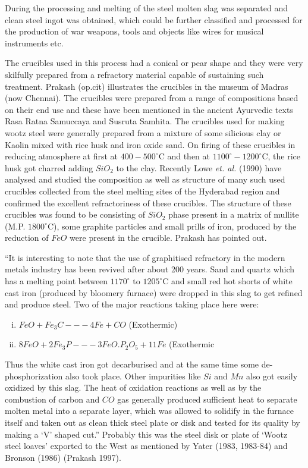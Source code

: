 During the processing and melting of the steel molten slag was separated and clean steel ingot was obtained, which could be further classified and processed for the production of war weapons, tools and objects like wires for musical instruments etc. 

The crucibles used in this process had a conical or pear shape and they were very skilfully prepared from a refractory material capable of sustaining such treatment. Prakash (op.cit) illustrates the crucibles in the museum of Madras (now Chennai). The crucibles were prepared from a range of compositions based on their end use and these have been mentioned in the ancient Ayurvedic texts Rasa Ratna Samuccaya and Susruta Samhita. The crucibles used for making wootz steel were generally prepared from a mixture of some silicious clay or Kaolin mixed with rice husk and iron oxide sand. On firing of these crucibles in reducing atmosphere at first at $400-500^\circ$C and then at $1100^\circ-1200^\circ$C, the rice husk got charred adding $SiO_2$ to the clay. Recently Lowe {\it et. al.} (1990) have analysed and studied the composition as well as structure of many such used crucibles collected from the steel melting sites of the Hyderabad region and confirmed the excellent refractoriness of these crucibles. The structure of these crucibles was found to be consisting of $SiO_2$ phase present in a matrix of mullite (M.P. $1800^\circ$C), some graphite particles and small prills of iron, produced by the reduction of $FeO$ were present in the crucible. Prakash has pointed out.

“It is interesting to note that the use of graphitised refractory in the modern metals industry has been revived after about 200 years. Sand and quartz which has a melting point between $1170^\circ$ to $1205^\circ$C and small red hot shorts of white cast iron (produced by bloomery furnace) were dropped in this slag to get refined and produce steel. Two of the major reactions taking place here were:
\begin{enumerate}[(i)]
\item $FeO + Fe_3C---4Fe + CO$ (Exothermic)                                     
\item $8FeO + 2Fe_3P--- 3FeO.P_2O_5 + 11Fe$ (Exothermic
\end{enumerate}

Thus the white cast iron got decarburised and at the same time some de-phosphorization also took place. Other impurities like $Si$ and $Mn$ also got easily oxidized by this slag. The heat of oxidation reactions as well as by the combustion of carbon and $CO$ gas generally produced sufficient heat to separate molten metal into a separate layer, which was allowed to solidify in the furnace itself and taken out as clean thick steel plate or disk and tested for its quality by making a ‘V’ shaped cut.”  Probably this was the steel disk or plate of ‘Wootz steel loaves’ exported to the West as mentioned by Yater (1983, 1983-84) and Bronson (1986) (Prakash 1997).

